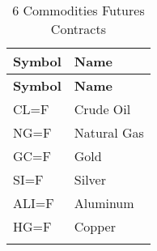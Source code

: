 \begin{longtable}{|l|l|}
\hline
\textbf{Symbol} & \textbf{Name}  \\
\endfirsthead

\hline
\textbf{Symbol} & \textbf{Name} \\
\endhead

\endfoot

\hline
CL=F & Crude Oil \\ \hline
NG=F & Natural Gas \\ \hline
GC=F & Gold \\ \hline
SI=F & Silver \\ \hline
ALI=F & Aluminum \\ \hline
HG=F & Copper \\ \hline
\caption{6 Commodities Futures Contracts}
\label{tab:commodities}
\end{longtable}

